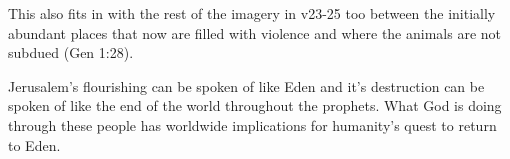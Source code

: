 \documentclass[11pt]{article}
\begin{document}
This also fits in with the rest of the imagery in v23-25 too between the initially abundant places that now are filled with violence and where the animals are not subdued (Gen 1:28).

Jerusalem's flourishing can be spoken of like Eden and it's destruction can be spoken of like the end of the world throughout the prophets. What God is doing through these people has worldwide implications for humanity's quest to return to Eden.
\end{document}
